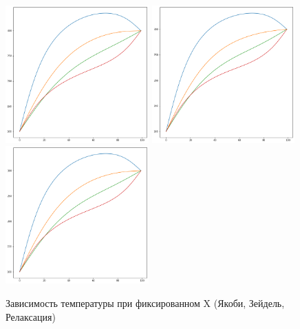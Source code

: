 \documentclass[20pt]{article}
\begin{document}
    \begin{figure}[h!]
        \centering
        \includegraphics[width=55mm]{x_seidel.png}
        \includegraphics[width=55mm]{x_jacobi.png}
        \includegraphics[width=55mm]{x_relax.png}
        \caption{Зависимость температуры при фиксированном X (Якоби, Зейдель, Релаксация)}
        \label{setup}
    \end{figure}
\end{document}
